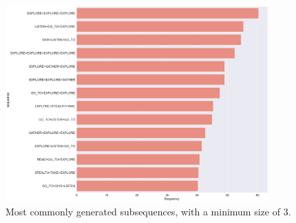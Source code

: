



\begin{figure}[]
    \centering
    \includegraphics[width=0.9\textwidth]{included-papers-tex/paper-8/figures/CommonSubsequence-GSP.png}
    \caption{Most commonly generated subsequences, with a minimum size of 3.}
    \label{figs:evaluation:CommonSequence}
\end{figure}



